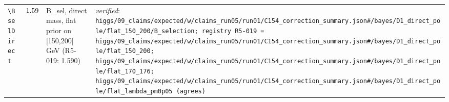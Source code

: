 {\begin{longtable}{@{}>{\raggedright\arraybackslash}p{}>{\raggedright\arraybackslash}p{}>{\raggedright\arraybackslash}p{}>{\raggedright\arraybackslash}p{}@{}}
\texttt{\textbackslash BselDirect} & $1.59$ & B\_\allowbreak{}sel, direct mass, flat prior on [150,200] GeV (R5-019: 1.590) & \emph{verified}: \texttt{higgs/\allowbreak{}09\_\allowbreak{}claims/\allowbreak{}expected/\allowbreak{}w/\allowbreak{}claims\_\allowbreak{}run05/\allowbreak{}run01/\allowbreak{}C154\_\allowbreak{}correction\_\allowbreak{}summary.json\#/\allowbreak{}bayes/\allowbreak{}D1\_\allowbreak{}direct\_\allowbreak{}pole/\allowbreak{}flat\_\allowbreak{}150\_\allowbreak{}200/\allowbreak{}B\_\allowbreak{}selection; registry R5-019 = higgs/\allowbreak{}09\_\allowbreak{}claims/\allowbreak{}expected/\allowbreak{}w/\allowbreak{}claims\_\allowbreak{}run05/\allowbreak{}run01/\allowbreak{}C154\_\allowbreak{}correction\_\allowbreak{}summary.json\#/\allowbreak{}bayes/\allowbreak{}D1\_\allowbreak{}direct\_\allowbreak{}pole/\allowbreak{}flat\_\allowbreak{}150\_\allowbreak{}200; higgs/\allowbreak{}09\_\allowbreak{}claims/\allowbreak{}expected/\allowbreak{}w/\allowbreak{}claims\_\allowbreak{}run05/\allowbreak{}run01/\allowbreak{}C154\_\allowbreak{}correction\_\allowbreak{}summary.json\#/\allowbreak{}bayes/\allowbreak{}D1\_\allowbreak{}direct\_\allowbreak{}pole/\allowbreak{}flat\_\allowbreak{}170\_\allowbreak{}176; higgs/\allowbreak{}09\_\allowbreak{}claims/\allowbreak{}expected/\allowbreak{}w/\allowbreak{}claims\_\allowbreak{}run05/\allowbreak{}run01/\allowbreak{}C154\_\allowbreak{}correction\_\allowbreak{}summary.json\#/\allowbreak{}bayes/\allowbreak{}D1\_\allowbreak{}direct\_\allowbreak{}pole/\allowbreak{}flat\_\allowbreak{}lambda\_\allowbreak{}pm0p05 (agrees)} \\

\end{longtable}}
